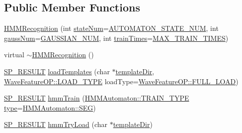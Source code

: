 \subsection*{Public Member Functions}
\begin{DoxyCompactItemize}
\item 
\hyperlink{class_h_m_m_recognition_a527df82050d6a04a9aa0be6498532feb}{H\+M\+M\+Recognition} (int \hyperlink{class_h_m_m_recognition_ac9be31139899e7e69694de527d229fd8}{state\+Num}=\hyperlink{configure__hmm_8h_aa9cc71cb42394379957677c761aae79e}{A\+U\+T\+O\+M\+A\+T\+O\+N\+\_\+\+S\+T\+A\+T\+E\+\_\+\+N\+U\+M}, int \hyperlink{class_h_m_m_recognition_af01765163d9d0092534231a20183b0e2}{gauss\+Num}=\hyperlink{configure__hmm_8h_a8f9db0624fff0b17f641785bb8d66a82}{G\+A\+U\+S\+S\+I\+A\+N\+\_\+\+N\+U\+M}, int \hyperlink{class_h_m_m_recognition_ad7bbe647d17214ad2b0de893bc03a8d5}{train\+Times}=\hyperlink{configure__hmm_8h_a52e22519b5a37e58632e9183d5197b86}{M\+A\+X\+\_\+\+T\+R\+A\+I\+N\+\_\+\+T\+I\+M\+E\+S})
\item 
virtual \hyperlink{class_h_m_m_recognition_a035b79783e60523afb4138b65be8692f}{$\sim$\+H\+M\+M\+Recognition} ()
\item 
\hyperlink{tool_8h_ab71a1f2fb85a32402ced5c483105b38e}{S\+P\+\_\+\+R\+E\+S\+U\+L\+T} \hyperlink{class_h_m_m_recognition_aceee222a2b4a3f6bbfe59e0a0fbe5e9b}{load\+Templates} (char $\ast$\hyperlink{class_h_m_m_recognition_ae665e0044a1a240b77ff84e877aa3170}{template\+Dir}, \hyperlink{class_wave_feature_o_p_abd93c85d1ed5fbc148d41b7f32fc1d84}{Wave\+Feature\+O\+P\+::\+L\+O\+A\+D\+\_\+\+T\+Y\+P\+E} load\+Type=\hyperlink{class_wave_feature_o_p_abd93c85d1ed5fbc148d41b7f32fc1d84a1b64a07dfde0c2d4132bc343f4475856}{Wave\+Feature\+O\+P\+::\+F\+U\+L\+L\+\_\+\+L\+O\+A\+D})
\item 
\hyperlink{tool_8h_ab71a1f2fb85a32402ced5c483105b38e}{S\+P\+\_\+\+R\+E\+S\+U\+L\+T} \hyperlink{class_h_m_m_recognition_a1bbccaae5aef122d97ae21589f7ced26}{hmm\+Train} (\hyperlink{class_h_m_m_automaton_aa3476c86db5e0791de6f07076f220348}{H\+M\+M\+Automaton\+::\+T\+R\+A\+I\+N\+\_\+\+T\+Y\+P\+E} \hyperlink{readhtk_8m_ac7798f4aec24aa6076b2b222bd91d4fd}{type}=\hyperlink{class_h_m_m_automaton_aa3476c86db5e0791de6f07076f220348a725fd42edf8b8e4b515b6296a7d67bb3}{H\+M\+M\+Automaton\+::\+S\+E\+G})
\item 
\hyperlink{tool_8h_ab71a1f2fb85a32402ced5c483105b38e}{S\+P\+\_\+\+R\+E\+S\+U\+L\+T} \hyperlink{class_h_m_m_recognition_a206cc7b9f0c2837c9773aa1f01bc4b93}{hmm\+Try\+Load} (char $\ast$\hyperlink{class_h_m_m_recognition_ae665e0044a1a240b77ff84e877aa3170}{template\+Dir})

\end{DoxyCompactItemize}
